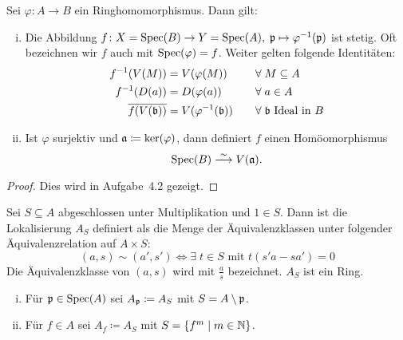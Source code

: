 
\begin{prop}
\label{prop:4.9}
	Sei $\varphi\colon A \to B$ ein Ringhomomorphismus. Dann gilt:
	\begin{enumerate}[i)]
		\item Die Abbildung $f\colon X = \operatorname{Spec}(B) \to Y = \operatorname{Spec}(A),\; \mathfrak{p} \mapsto \varphi^{-1}(\mathfrak{p})$ ist stetig. Oft bezeichnen wir $f$ auch mit $\operatorname{Spec}(\varphi) = f$. Weiter gelten folgende Identitäten:
		\begin{alignat*}{2}
			f^{-1}(V(M)) &= V(\varphi(M)) \quad &&\forall \;M \subseteq A\\
			f^{-1}(D(a)) &= D(\varphi(a)) \quad &&\forall \;a \in A\\
			\overline{f(V(\mathfrak{b}))} &= V(\varphi^{-1}(\mathfrak{b})) \quad &&\forall\; \mathfrak{b} \text{ Ideal in } B
		\end{alignat*}
		\item Ist $\varphi$ surjektiv und $\mathfrak{a} \coloneqq \ker(\varphi)$, dann definiert $f$ einen Homöomorphismus
		\[
			\operatorname{Spec}(B) \overset{\sim}{\longrightarrow} V(\mathfrak{a}).
		\]
	\end{enumerate}
	
	\begin{proof}
		Dies wird in Aufgabe~4.2 gezeigt.
	\end{proof}
\end{prop}

\begin{eri}
	Sei $S \subseteq A$ abgeschlossen unter Multiplikation und $1 \in S$. Dann ist die Lokalisierung $A_S$ definiert als die Menge der Äquivalenzklassen unter folgender Äquivalenzrelation auf $A \times S$:
	\[
		(a,s)\sim(a',s') \Longleftrightarrow \exists\; t \in S \text{ mit } t(s'a-sa') = 0
	\]
	Die Äquivalenzklasse von $(a,s)$ wird mit $\frac{a}{s}$ bezeichnet. $A_S$ ist ein Ring.
	\begin{enumerate}[i)]
		\item Für $\mathfrak{p} \in \operatorname{Spec}(A)$ sei $A_{\mathfrak{p}}\coloneqq A_S$ mit $S=A\setminus \mathfrak{p}$.
		\item Für $f \in A$ sei $A_f \coloneqq A_S$ mit $S = \{f^m \mid m \in \mathbb {N} \}$.
	\end{enumerate}
\end{eri}

